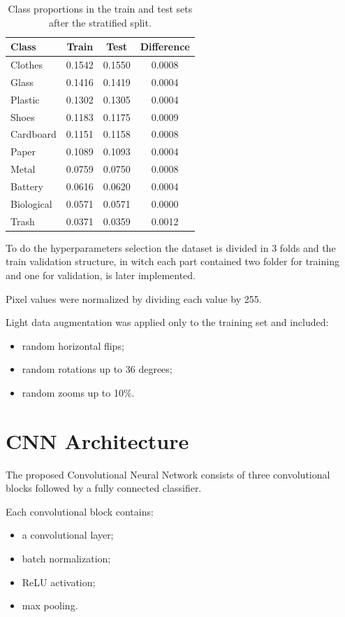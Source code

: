 \documentclass{article}
\begin{document}
\begin{table}[h]
\centering
\caption{Class proportions in the train and test sets after the stratified split.}
\label{tab:train_test_split}
\begin{tabular}{lccc}
\hline
Class & Train & Test & Difference \\
\hline
Clothes   & 0.1542 & 0.1550 & 0.0008 \\
Glass     & 0.1416 & 0.1419 & 0.0004 \\
Plastic   & 0.1302 & 0.1305 & 0.0004 \\
Shoes     & 0.1183 & 0.1175 & 0.0009 \\
Cardboard & 0.1151 & 0.1158 & 0.0008 \\
Paper     & 0.1089 & 0.1093 & 0.0004 \\
Metal     & 0.0759 & 0.0750 & 0.0008 \\
Battery   & 0.0616 & 0.0620 & 0.0004 \\
Biological& 0.0571 & 0.0571 & 0.0000 \\
Trash     & 0.0371 & 0.0359 & 0.0012 \\
\hline
\end{tabular}
\end{table}


To do the hyperparameters selection the dataset is divided in 3 folds and the train validation structure, in witch each part contained two folder for training and one for validation, is later implemented.

Pixel values were normalized by dividing each value by 255.

Light data augmentation was applied only to the training set and
included:
\begin{itemize}
\item random horizontal flips;
\item random rotations up to 36 degrees;
\item random zooms up to 10\%.
\end{itemize}


\section{CNN Architecture}

The proposed Convolutional Neural Network consists of three
convolutional blocks followed by a fully connected classifier.

Each convolutional block contains:
\begin{itemize}
\item a convolutional layer;
\item batch normalization;
\item ReLU activation;
\item max pooling.
\end{itemize}
\end{document}
